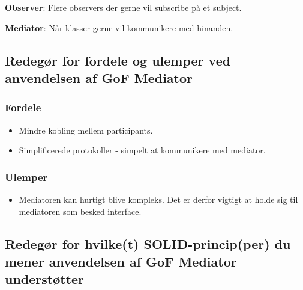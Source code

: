 \textbf{Observer}: Flere observers der gerne vil subscribe på et subject.

\textbf{Mediator}: Når klasser gerne vil kommunikere med hinanden.

\subsection{Redegør for fordele og ulemper ved anvendelsen af GoF Mediator}

\subsubsection{Fordele}
\begin{itemize}
	\item Mindre kobling mellem participants.
	\item Simplificerede protokoller - simpelt at kommunikere med mediator.
\end{itemize}

\subsubsection{Ulemper}
\begin{itemize}
	\item Mediatoren kan hurtigt blive kompleks. Det er derfor vigtigt at holde sig til mediatoren som besked interface.
\end{itemize}
\subsection{Redegør for hvilke(t) SOLID-princip(per) du mener anvendelsen af GoF Mediator understøtter}
